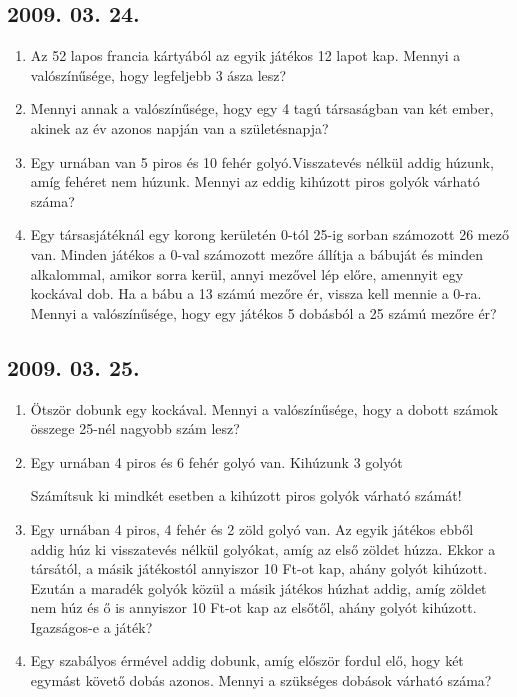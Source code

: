 \subsection*{2009. 03. 24.}
\begin{enumerate}
\item Az 52 lapos francia kártyából az egyik játékos 12 lapot kap. Mennyi a valószínűsége, hogy legfeljebb 3 ásza lesz?

\item Mennyi annak a valószínűsége, hogy egy 4 tagú társaságban van két ember, akinek az év azonos napján van a születésnapja?

\item Egy urnában van 5 piros és 10 fehér golyó.Visszatevés nélkül addig húzunk, amíg fehéret nem húzunk. Mennyi az eddig kihúzott piros golyók várható száma?

\item Egy társasjátéknál egy korong kerületén 0-tól 25-ig sorban számozott 26 mező van. Minden játékos a 0-val számozott mezőre állítja a bábuját és minden alkalommal, amikor sorra kerül, annyi mezővel lép előre, amennyit egy kockával dob. Ha a bábu a 13 számú mezőre ér, vissza kell mennie a 0-ra. Mennyi a valószínűsége, hogy egy játékos 5 dobásból a 25 számú mezőre ér?
\end{enumerate}
\subsection*{2009. 03. 25.}
\begin{enumerate}
\item Ötször dobunk egy kockával. Mennyi a valószínűsége, hogy a dobott számok összege 25-nél nagyobb szám lesz?

\item Egy urnában 4 piros és 6 fehér golyó van. Kihúzunk 3 golyót
Számítsuk ki mindkét esetben a kihúzott piros golyók várható számát!

\item Egy urnában 4 piros, 4 fehér és 2 zöld golyó van. Az egyik játékos ebből addig húz ki visszatevés nélkül golyókat, amíg az első zöldet húzza. Ekkor a társától, a másik játékostól annyiszor 10 Ft-ot kap, ahány golyót kihúzott. Ezután a maradék golyók közül a másik játékos húzhat addig, amíg zöldet nem húz és ő is annyiszor 10 Ft-ot kap az elsőtől, ahány golyót kihúzott. Igazságos-e a játék?

\item Egy szabályos érmével addig dobunk, amíg először fordul elő, hogy két egymást követő dobás azonos. Mennyi a szükséges dobások várható száma?
\end{enumerate}
